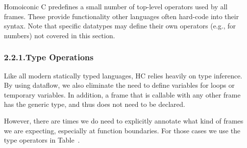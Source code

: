 \documentclass[preprint]{{sigplanconf}}
\begin{document}
\noindent{}Homoiconic C predefines a small number of top-level operators used by all
frames. These provide functionality other languages often hard-code into
their syntax. Note that specific datatypes may define their own operators
(e.g., \mdcode{+} for numbers) not covered in this section.%

\subsubsection{2.2.1.\hspace*{0.5em}Type Operations}\label{sec-type-operations}%

\noindent{}Like all modern statically typed languages, HC relies heavily on type
inference. By using dataflow, we also eliminate the need to define
variables for loops or temporary variables. In addition, a frame that is
callable with any other frame has the generic type, and thus does not need to be
declared.%

However, there are times we do need to explicitly annotate what kind of
frames we are expecting, especially at function boundaries. For those
cases we use the type operators in Table~.%
\end{document}
